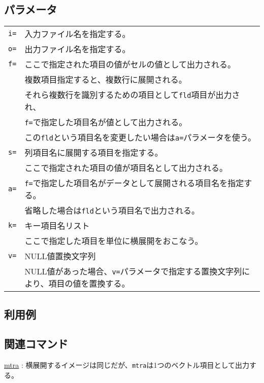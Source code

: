 \subsection*{パラメータ}
\begin{table}[htbp]
{\small
\begin{tabular}{ll}
\verb|i=|    & 入力ファイル名を指定する。\\
\verb|o=|    & 出力ファイル名を指定する。\\
\verb|f=|    & ここで指定された項目の値がセルの値として出力される。\\
             & 複数項目指定すると、複数行に展開される。\\
             & それら複数行を識別するための項目として\verb|fld|項目が出力され、\\
             & \verb|f=|で指定した項目名が値として出力される。 \\
             & この\verb|fld|という項目名を変更したい場合は\verb|a=|パラメータを使う。\\
\verb|s=|    & 列項目名に展開する項目を指定する。\\
             & ここで指定された項目の値が項目名として出力される。\\
\verb|a=|    & \verb|f=|で指定した項目名がデータとして展開される項目名を指定する。\\
             & 省略した場合は\verb|fld|という項目名で出力される。\\
\verb|k=|    & キー項目名リスト\\
             & ここで指定した項目を単位に横展開をおこなう。\\
\verb|v=|    & NULL値置換文字列\\
             & NULL値があった場合、\verb|v=|パラメータで指定する置換文字列により、項目の値を置換する。\\
\end{tabular} 
}
\end{table} 

\subsection*{利用例}


\subsection*{関連コマンド}
\hyperref[sect:mtra]{mtra} : 横展開するイメージは同じだが、\verb|mtra|は1つのベクトル項目として出力する。

%
